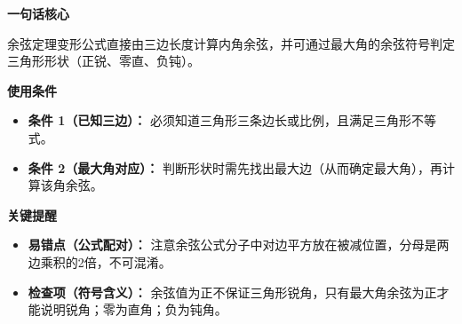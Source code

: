 \begin{summarybox}
	\textbf{\textcolor{CSummary}{一句话核心}}

	余弦定理变形公式直接由三边长度计算内角余弦，并可通过最大角的余弦符号判定三角形形状（正锐、零直、负钝）。

	\medskip
	\textbf{\textcolor{CSummary}{使用条件}}
	\begin{itemize}[leftmargin=*, itemsep=0.5em, topsep=0.4em]
		\item \textbf{条件 1（已知三边）：} 必须知道三角形三条边长或比例，且满足三角形不等式。
		\item \textbf{条件 2（最大角对应）：} 判断形状时需先找出最大边（从而确定最大角），再计算该角余弦。
	\end{itemize}

	\medskip
	\textbf{\textcolor{CSummary}{关键提醒}}
	\begin{itemize}[leftmargin=*, itemsep=0.5em, topsep=0.4em]
		\item \textbf{易错点（公式配对）：} 注意余弦公式分子中对边平方放在被减位置，分母是两边乘积的2倍，不可混淆。
		\item \textbf{检查项（符号含义）：} 余弦值为正不保证三角形锐角，只有最大角余弦为正才能说明锐角；零为直角；负为钝角。
	\end{itemize}
\end{summarybox}

